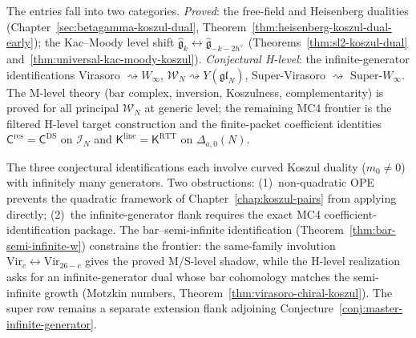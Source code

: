 \begin{remark}\label{rem:koszul-table-status}
The entries fall into two categories.
\emph{Proved}: the free-field and Heisenberg dualities (Chapter~\ref{sec:betagamma-koszul-dual}, Theorem~\ref{thm:heisenberg-koszul-dual-early}); the Kac--Moody level shift $\widehat{\mathfrak{g}}_k \leftrightarrow \widehat{\mathfrak{g}}_{-k-2h^\vee}$ (Theorems~\ref{thm:sl2-koszul-dual} and~\ref{thm:universal-kac-moody-koszul}).
\emph{Conjectural H-level}: the infinite-generator identifications Virasoro $\rightsquigarrow W_\infty$, $\mathcal{W}_N \rightsquigarrow Y(\mathfrak{gl}_N)$, Super-Virasoro $\rightsquigarrow$ Super-$W_\infty$.  The M-level theory (bar complex, inversion, Koszulness, complementarity) is proved for all principal $\mathcal{W}_N$ at generic level; the remaining MC4 frontier is the filtered H-level target construction and the finite-packet coefficient identities $\mathsf{C}^{\mathrm{res}} = \mathsf{C}^{\mathrm{DS}}$ on $\mathcal{I}_N$ and $\mathsf{K}^{\mathrm{line}} = \mathsf{K}^{\mathrm{RTT}}$ on $\Delta_{a,0}(N)$.
\end{remark}

\begin{remark}
The three conjectural identifications each involve curved Koszul duality ($m_0 \neq 0$) with infinitely many generators.  Two obstructions: (1)~non-quadratic OPE prevents the quadratic framework of Chapter~\ref{chap:koszul-pairs} from applying directly; (2)~the infinite-generator flank requires the exact MC4 coefficient-identification package.  The bar--semi-infinite identification (Theorem~\ref{thm:bar-semi-infinite-w}) constrains the frontier: the same-family involution $\mathrm{Vir}_c \leftrightarrow \mathrm{Vir}_{26-c}$ gives the proved M/S-level shadow, while the H-level realization asks for an infinite-generator dual whose bar cohomology matches the semi-infinite growth (Motzkin numbers, Theorem~\ref{thm:virasoro-chiral-koszul}).  The super row remains a separate extension flank adjoining Conjecture~\ref{conj:master-infinite-generator}.
\end{remark}

